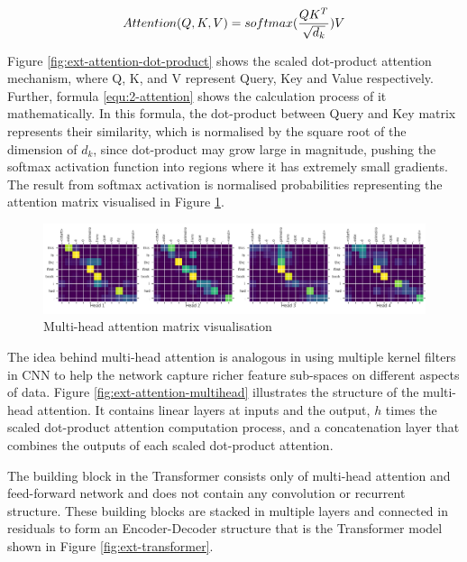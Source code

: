 \begin{equation}
    Attention(Q, K, V) = softmax(\frac{QK^T}{\sqrt{d_k}})V
    \eqcite{vaswani2017attention}
    \label{equ:2-attention}
\end{equation}

Figure \ref{fig:ext-attention-dot-product} shows the scaled dot-product attention mechanism, where Q, K, and V represent Query, Key and Value respectively.
Further, formula \ref{equ:2-attention} shows the calculation process of it mathematically.
In this formula, the dot-product between Query and Key matrix represents their similarity, which is normalised by the square root of the dimension of $d_k$, since dot-product may grow large in magnitude, pushing the softmax activation function into regions where it has extremely small gradients.
The result from softmax activation is normalised probabilities representing the attention matrix visualised in Figure  \ref{fig:ext-attention_map_portuguese}.

\begin{figure}[!ht]
    \centering
    \includegraphics[width=\textwidth]{literature/imgs/ext-attention_map_portuguese.png}
    \caption{Multi-head attention matrix visualisation \cite{tensorflow2021transformer}}
    \label{fig:ext-attention_map_portuguese}
\end{figure}

The idea behind multi-head attention is analogous in using multiple kernel filters in CNN to help the network capture richer feature sub-spaces on different aspects of data.
Figure \ref{fig:ext-attention-multihead} illustrates the structure of the multi-head attention. It contains linear layers at inputs and the output, $h$ times the scaled dot-product attention computation process, and a concatenation layer that combines the outputs of each scaled dot-product attention.

The building block in the Transformer consists only of multi-head attention and feed-forward network and does not contain any convolution or recurrent structure.
These building blocks are stacked in multiple layers and connected in residuals to form an Encoder-Decoder structure that is the Transformer model shown in Figure \ref{fig:ext-transformer}.

